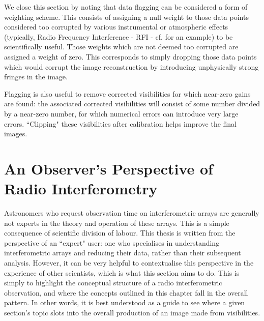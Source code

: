 \pg

\pg
We close this section by noting that data flagging can be considered a form of weighting scheme. This consists of assigning a null weight to those data points considered too corrupted by various instrumental or atmospheric effects (typically, Radio Frequency Interference - RFI - cf.  for an example) to be scientifically useful. Those weights which are not deemed too corrupted are assigned a weight of zero. This corresponds to simply dropping those data points which would corrupt the image reconstruction by introducing unphysically strong fringes in the image.

\pg
Flagging is also useful to remove corrected visibilities for which near-zero gains are found: the associated corrected visibilities will consist of some number divided by a near-zero number, for which numerical errors can introduce very large errors. ``Clipping" these visibilities after calibration helps improve the final images.

\section{An Observer's Perspective of Radio Interferometry}

\pg
Astronomers who request observation time on interferometric arrays are generally not experts in the theory and operation of these arrays. This is a simple consequence of scientific division of labour. This thesis is written from the perspective of an ``expert" user: one who specialises in understanding interferometric arrays and reducing their data, rather than their subsequent analysis. However, it can be very helpful to contextualise this perspective in the experience of other scientists, which is what this section aims to do. This is simply to highlight the conceptual structure of a radio interferometric observation, and where the concepts outlined in this chapter fall in the overall pattern. In other words, it is best understood as a guide to see where a given section's topic slots into the overall production of an image made from visibilities.

